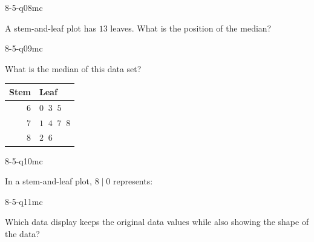 \begin{practiceQuestion}{8-5-q08}{mc}
\begin{questionText}
A stem-and-leaf plot has $13$ leaves. What is the position of the median?
\end{questionText}
\end{practiceQuestion}

\begin{practiceQuestion}{8-5-q09}{mc}
\begin{questionText}
What is the median of this data set?

\begin{center}
\begin{tabular}{r|l}
\textbf{Stem} & \textbf{Leaf} \\
\hline
$6$ & $0\;\;3\;\;5$ \\
$7$ & $1\;\;4\;\;7\;\;8$ \\
$8$ & $2\;\;6$
\end{tabular}
\end{center}
\end{questionText}
\end{practiceQuestion}

\begin{practiceQuestion}{8-5-q10}{mc}
\begin{questionText}
In a stem-and-leaf plot, $8 \mid 0$ represents:
\end{questionText}
\end{practiceQuestion}

\begin{practiceQuestion}{8-5-q11}{mc}
\begin{questionText}
Which data display keeps the original data values while also showing the shape of the data?
\end{questionText}
\end{practiceQuestion}

